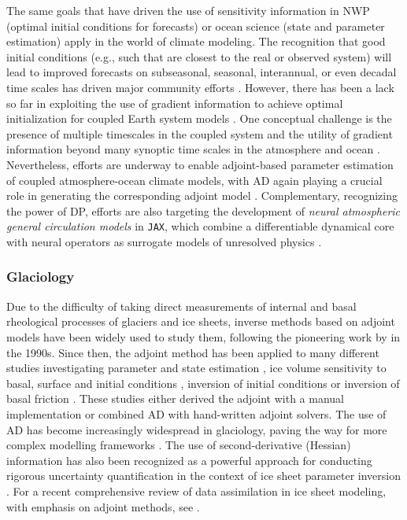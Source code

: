 The same goals that have driven the use of sensitivity information in NWP (optimal initial conditions for forecasts) or ocean science (state and parameter estimation) apply in the world of climate modeling.
The recognition that good initial conditions (e.g., such that are closest to the real or observed system) will lead to improved forecasts on subseasonal, seasonal, interannual, or even decadal time scales has driven major community efforts \cite{Meehl.2021}. 
However, there has been a lack so far in exploiting the use of gradient information to achieve optimal initialization for coupled Earth system models \cite{Frolov.2023}. 
One conceptual challenge is the presence of multiple timescales in the coupled system and the utility of gradient information beyond many synoptic time scales in the atmosphere and ocean \cite{lea2000sensitivity,Lea:2002cv}.
Nevertheless, efforts are underway to enable adjoint-based parameter estimation of coupled atmosphere-ocean climate models, with AD again playing a crucial role in generating the corresponding adjoint model
\cite{Blessing.2014,Lyu.2018,Stammer:2018de}.
Complementary, recognizing the power of DP, efforts are also targeting the development of \textit{neural atmospheric general circulation models} in \texttt{JAX}, which combine a differentiable dynamical core with neural operators as surrogate models of unresolved physics \cite{Kochkov.2023}.

\subsubsection{Glaciology}

Due to the difficulty of taking direct measurements of internal and basal rheological processes of glaciers and ice sheets, inverse methods based on adjoint models have been widely used to study them, following the pioneering work by \cite{macayeal1992basal} in the 1990s. 
Since then, the adjoint method has been applied to many different studies investigating parameter and state estimation \cite{Vieli.2006, goldberg2013parameter}, ice volume sensitivity to basal, surface and initial conditions \cite{heimbach2009greenland}, inversion of initial conditions \cite{mosbeux2016comparison} or inversion of basal friction \cite{Petra.2012, morlighem2013inversion}.
These studies either derived the adjoint with a manual implementation or combined AD with hand-written adjoint solvers. 
The use of AD has become increasingly widespread in glaciology, paving the way for more complex modelling frameworks \cite{hascoet2018source, Gaikwad.2023}. 
The use of second-derivative (Hessian) information has also been recognized as a powerful approach for conducting rigorous uncertainty quantification in the context of ice sheet parameter inversion \cite{Petra.2014,Isaac:2015hf}.
For a recent comprehensive review of data assimilation in ice sheet modeling, with emphasis on adjoint methods, see \cite{Morlighem.2023}.

